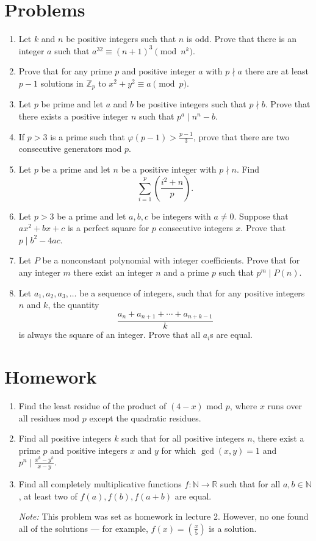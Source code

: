 \documentclass{article}
\newcommand\Zz{\mathbb{Z}}
\begin{document}
\section{Problems}
\begin{enumerate}
  \item Let $k$ and $n$ be positive integers such that $n$ is odd. Prove that
    there is an integer $a$ such that $a^{32}\equiv(n+1)^3\pmod{n^k}$.
  \item Prove that for any prime $p$ and positive integer $a$ with $p\nmid a$
    there are at least $p-1$ solutions in $\Zz_p$ to $x^2+y^2\equiv a\pmod p$.
  \item Let $p$ be prime and let $a$ and $b$ be positive integers such that
    $p\nmid b$. Prove that there exists a positive integer $n$ such that
    $p^a\mid n^n-b$.
  \item If $p>3$ is a prime such that $\varphi(p-1)>\frac{p-1}3$, prove that
    there are two consecutive generators mod $p$.
  \item Let $p$ be a prime and let $n$ be a positive integer with $p\nmid n$.
    Find \[\sum_{i=1}^p\left(\frac{i^2+n}p\right).\]
  \item Let $p>3$ be a prime and let $a,b,c$ be integers with $a\ne 0$. Suppose
    that $ax^2+bx+c$ is a perfect square for $p$ consecutive integers $x$. Prove
    that $p\mid b^2-4ac$.
  \item Let $P$ be a nonconstant polynomial with integer coefficients. Prove that for any
    integer $m$ there exist an integer $n$ and a prime $p$ such that $p^m\mid
    P(n)$.
  \item Let $a_1,a_2,a_3,\ldots$ be a sequence of integers, such that for any
    positive integers $n$ and $k$, the quantity
    \[\frac{a_n+a_{n+1}+\cdots+a_{n+k-1}}k\]
    is always the square of an integer. Prove that all $a_i$s are equal.
\end{enumerate}
\newpage
\section{Homework}
\begin{enumerate}
  \item Find the least residue of the product of $(4-x)$ mod $p$, where $x$ runs
    over all residues mod $p$ except the quadratic residues.
  \item Find all positive integers $k$ such that for all positive integers $n$,
    there exist a prime $p$ and positive integers $x$ and $y$ for which
    $\gcd(x,y)=1$ and $p^n\mid \frac{x^k-y^k}{x-y}$.
  \item Find all completely multiplicative functions $f:\mathbb N\to\mathbb R$
    such that for all $a,b\in\mathbb N$, at least two of $f(a),f(b),f(a+b)$ are
    equal.

    \emph{Note:} This problem was set as homework in lecture 2. However, no one found all of
    the solutions --- for example, $f(x)=\left(\frac x5\right)$ is a solution.
\end{enumerate}
\end{document}
